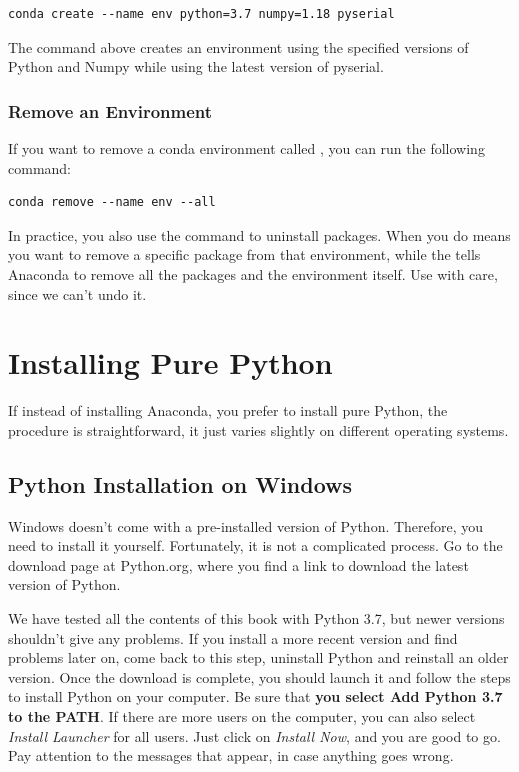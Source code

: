 \begin{verbatim}
conda create --name env python=3.7 numpy=1.18 pyserial
\end{verbatim}

The command above creates an environment using the specified versions of Python and Numpy while using the latest version of pyserial.

\subsubsection{Remove an Environment}
If you want to remove a conda environment called , you can run the following command:

\begin{verbatim}
conda remove --name env --all
\end{verbatim}

\sloppy In practice, you also use the  command to uninstall packages. When you do  means you want to remove a specific package from that environment, while the  tells Anaconda to remove all the packages and the environment itself. Use with care, since we can't undo it.

\section{Installing Pure Python}\label{sec:installing-pure-python}
If instead of installing Anaconda, you prefer to install pure Python, the procedure is straightforward, it just varies slightly on different operating systems.

\subsection{Python Installation on Windows}\label{subsec:python-installation-on-windows}
Windows doesn't come with a pre-installed version of Python. Therefore, you need to install it yourself. Fortunately, it is not a complicated process. Go to the download page at Python.org, where you find a link to download the latest version of Python.

We have tested all the contents of this book with Python 3.7, but newer versions shouldn't give any problems. If you install a more recent version and find problems later on, come back to this step, uninstall Python and reinstall an older version. Once the download is complete, you should launch it and follow the steps to install Python on your computer. Be sure that \textbf{you select Add Python 3.7 to the PATH}. If there are more users on the computer, you can also select \emph{Install Launcher} for all users. Just click on \textit{Install Now}, and you are good to go. Pay attention to the messages that appear, in case anything goes wrong.

